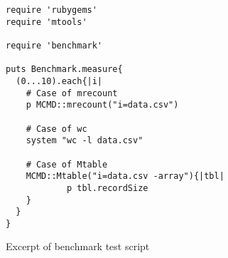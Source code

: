 \begin{figure}[htpb]
{\small
\begin{Verbatim}[baselinestretch=0.7,frame=single]
require 'rubygems'
require 'mtools'

require 'benchmark'

puts Benchmark.measure{
  (0...10).each{|i|
    # Case of mrecount
    p MCMD::mrecount("i=data.csv")

    # Case of wc
    system "wc -l data.csv"

    # Case of Mtable
    MCMD::Mtable("i=data.csv -array"){|tbl|
			p tbl.recordSize
    }
  }
}
\end{Verbatim}
}
\caption{Excerpt of benchmark test script \label{fig:mrecount_script}}
\end{figure}

%

